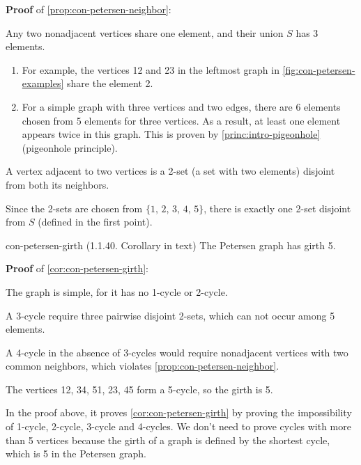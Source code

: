 \documentclass[../src/handouts/main.tex]{subfiles}
\begin{document}
\textbf{Proof} of \cref{prop:con-petersen-neighbor}:

\begin{enumerate*}
  \item Any two nonadjacent vertices share one element, and their union $S$ has 3 elements.
        \begin{enumerate}
          \item For example, the vertices 12 and 23 in the leftmost graph in \cref{fig:con-petersen-examples} share the element 2.
          \item For a simple graph with three vertices and two edges, there are 6 elements chosen from 5 elements for three vertices. As a result, at least one element appears twice in this graph. This is proven by \cref{princ:intro-pigeonhole} (pigeonhole principle).
        \end{enumerate}
  \item A vertex adjacent to two vertices is a 2-set (a set with two elements) disjoint from both its neighbors.
  \item Since the 2-sets are chosen from $\{ 1,\, 2,\, 3,\, 4,\, 5 \}$, there is exactly one 2-set disjoint from $S$ (defined in the first point).
\end{enumerate*}

\begin{corollary}{}{con-petersen-girth}
  (1.1.40. Corollary in text)
  The Petersen graph has girth 5.
\end{corollary}

\textbf{Proof} of \cref{cor:con-petersen-girth}:
\begin{enumerate*}
  \item The graph is simple, for it has no 1-cycle or 2-cycle.
  \item A 3-cycle require three pairwise disjoint 2-sets, which can not occur among 5 elements.
  \item A 4-cycle in the absence of 3-cycles would require nonadjacent vertices with two common neighbors, which violates \cref{prop:con-petersen-neighbor}.
  \item The vertices 12, 34, 51, 23, 45 form a 5-cycle, so the girth is 5.
\end{enumerate*}

In the proof above, it proves \cref{cor:con-petersen-girth} by proving the impossibility of 1-cycle, 2-cycle, 3-cycle and 4-cycles. We don't need to prove cycles with more than 5 vertices because the girth of a graph is defined by the shortest cycle, which is 5 in the Petersen graph.
\end{document}
